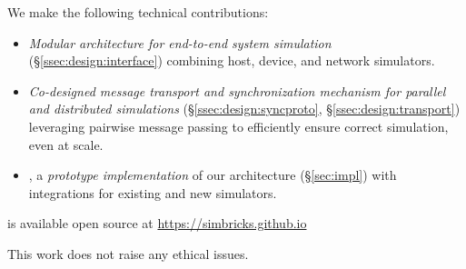 \smallskip\noindent
We make the following technical contributions:
\begin{itemize}
  \item \emph{Modular architecture for end-to-end system simulation}
    (\S\ref{ssec:design:interface}) combining host, device, and network
    simulators.

  \item \emph{Co-designed message transport and synchronization
    mechanism for parallel and distributed simulations}
    (\S\ref{ssec:design:syncproto}, \S\ref{ssec:design:transport}) leveraging
    pairwise message passing to efficiently ensure correct simulation, even
    at scale.

  \item \sysname, a \emph{prototype implementation} of our
    architecture (\S\ref{sec:impl}) with integrations for
    existing and new simulators.
\end{itemize}

\noindent
\sysname is available open source at \url{https://simbricks.github.io}

\noindent
This work does not raise any ethical issues.

